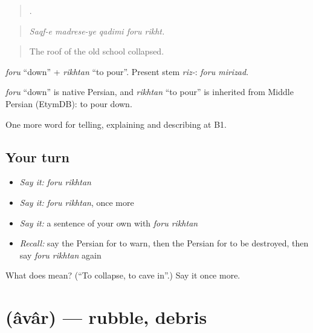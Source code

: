 \begin{quote}
    .
\end{quote}

\begin{quote}
\emph{Saqf-e madrese-ye qadimi foru rikht.}
\end{quote}

\begin{quote}
The roof of the old school collapsed.
\end{quote}

\emph{foru} \textquotedblleft{}down\textquotedblright{} + \emph{rikhtan} \textquotedblleft{}to pour\textquotedblright{}. Present stem \emph{riz-}: \emph{foru mirizad}.

\begin{cousinweb}
\emph{foru} \textquotedblleft{}down\textquotedblright{} is native Persian, and \emph{rikhtan} \textquotedblleft{}to pour\textquotedblright{} is inherited from Middle Persian (EtymDB): to pour down.
\end{cousinweb}

\begin{grammarlens}[title={What you've built}]
One more word for telling, explaining and describing at B1.
\end{grammarlens}

\subsection*{Your turn}
\begin{itemize}
\raggedright
  \item \emph{Say it:} \emph{foru rikhtan}
  \item \emph{Say it:} \emph{foru rikhtan}, once more
  \item \emph{Say it:} a sentence of your own with \emph{foru rikhtan}
  \item \emph{Recall:} say the Persian for to warn, then the Persian for to be destroyed, then say \emph{foru rikhtan} again
\end{itemize}

\begin{tcolorbox}[breakable,colback=teal!4,colframe=teal!35!black,title={Before you move on}]
What does   mean? (\textquotedblleft{}To collapse, to cave in\textquotedblright{}.) Say it once more.
\end{tcolorbox}
\section[\texorpdfstring{\fa{آوار} (âvâr)}{آوار (âvâr)}]{ (âvâr) — rubble, debris}

